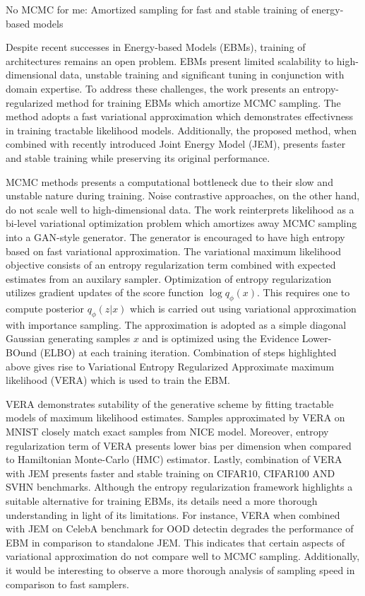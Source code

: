 \documentclass[11pt,letterpaper]{article}
\begin{document}
\begin{center}
  \large{No MCMC for me: Amortized sampling for fast and stable training of energy-based models}
\end{center}

Despite recent successes in Energy-based Models (EBMs), training of architectures remains an open problem. EBMs present limited scalability to high-dimensional data, unstable training and significant tuning in conjunction with domain expertise. To address these challenges, the work presents an entropy-regularized method for training EBMs which amortize MCMC sampling. The method adopts a fast variational approximation which demonstrates effectivness in training tractable likelihood models. Additionally, the proposed method, when combined with recently introduced Joint Energy Model (JEM), presents faster and stable training while preserving its original performance. 

MCMC methods presents a computational bottleneck due to their slow and unstable nature during training. Noise contrastive approaches, on the other hand, do not scale well to high-dimensional data. The work reinterprets likelihood as a bi-level variational optimization problem which amortizes away MCMC sampling into a GAN-style generator. The generator is encouraged to have high entropy based on fast variational approximation. The variational maximum likelihood objective consists of an entropy regularization term combined with expected estimates from an auxilary sampler. Optimization of entropy regularization utilizes gradient updates of the score function $\log q_{\phi}(x)$. This requires one to compute posterior $q_{\phi}(z|x)$ which is carried out using variational approximation with importance sampling. The approximation is adopted as a simple diagonal Gaussian generating samples $x$ and is optimized using the Evidence Lower-BOund (ELBO) at each training iteration. Combination of steps highlighted above gives rise to Variational Entropy Regularized Approximate maximum likelihood (VERA) which is used to train the EBM.  

VERA demonstrates sutability of the generative scheme by fitting tractable models of maximum likelihood estimates. Samples approximated by VERA on MNIST closely match exact samples from NICE model. Moreover, entropy regularization term of VERA presents lower bias per dimension when compared to Hamiltonian Monte-Carlo (HMC) estimator. Lastly, combination of VERA with JEM presents faster and stable training on CIFAR10, CIFAR100 AND SVHN benchmarks. Although the entropy regularization framework highlights a suitable alternative for training EBMs, its details need a more thorough understanding in light of its limitations. For instance, VERA when combined with JEM on CelebA benchmark for OOD detectin degrades the performance of EBM in comparison to standalone JEM. This indicates that certain aspects of variational approximation do not compare well to MCMC sampling. Additionally, it would be interesting to observe a more thorough analysis of sampling speed in comparison to fast samplers. 
\end{document}
